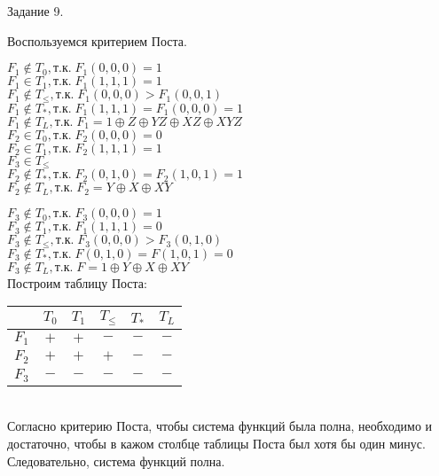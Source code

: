 \documentclass[a4paper,12pt]{report} %
\begin{document}
\bigskip

\begin{center}
Задание 9.\\
\end{center}

\begin{flushleft}
Воспользуемся критерием Поста.
\begin{multicols}{2}
$F_1\notin{T_0}, \text{т.к.}\; F_1(0,0,0)=1 $ \\
$F_1 \in{T_1},\text{т.к.}\; F_1(1,1,1)=1 $ \\
$F_1 \notin{T_\leq}, \text{т.к.}\; F_1(0,0,0)>F_1(0,0,1) $ \\
$F_1 \notin{T_*}, \text{т.к.}\; F_1(1,1,1)=F_1(0,0,0) = 1 $ \\
$F_1 \notin{T_L}, \text{т.к.}\; F_1=1 \oplus Z \oplus YZ \oplus XZ \oplus XYZ$ \\
\bigskip
$F_2 \in{T_0}, \text{т.к.}\; F_2(0,0,0)=0 $ \\
$F_2 \in{T_1},\text{т.к.}\; F_2(1,1,1)=1 $ \\
$F_3 \in{T_\leq}$ \\
$F_2 \notin{T_*}, \text{т.к.}\; F_2(0,1,0)=F_2(1,0,1) = 1 $ \\
$F_2 \notin{T_L}, \text{т.к.}\; F_2=Y \oplus X \oplus XY $ \\
\end{multicols}
\bigskip
$F_3 \notin{T_0}, \text{т.к.}\; F_3(0,0,0)=1 $ \\
$F_3 \notin{T_1},\text{т.к.}\; F_1(1,1,1)=0 $ \\
$F_3 \notin{T_\leq}, \text{т.к.}\; F_3(0,0,0)>F_3(0,1,0) $ \\
$F_3 \notin{T_*}, \text{т.к.}\; F(0,1,0)=F(1,0,1) = 0 $ \\
$F_3 \notin{T_L}, \text{т.к.}\; F=1 \oplus Y \oplus X \oplus XY$ \\

Построим таблицу Поста:\\
\bigskip
\begin{tabular}{| c | c | c | c | c | c |}
\hline
 & $T_0$ & $T_1$ & $T_\leq$ & $T_*$ & $T_L$ \\
 \hline
 $F_1 $& $+$ & $+$ & $-$ & $-$ & $-$\\
 \hline
 $F_2$ & $+$ & $+$ & $+$ & $-$ & $-$\\
 \hline
 $F_3$ & $-$ & $-$ & $-$ & $-$ & $-$\\
 \hline
\end{tabular}\\
\bigskip
Согласно критерию Поста, чтобы система функций была полна, необходимо и достаточно, чтобы в кажом столбце таблицы Поста был хотя бы один минус.\\
Следовательно, система функций полна.\\

\textbf{\color{red}{Сделать базисы}}
\end{flushleft}
\end{document}
